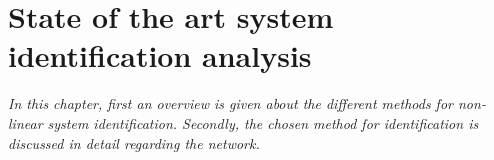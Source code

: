 \chapter{State of the art system identification analysis}
\label{identification_methods}

\emph{In this chapter, first an overview is given about the different methods for non-linear system identification. Secondly, the chosen method for identification is discussed in detail regarding the network.}